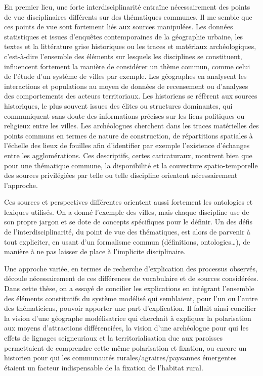 En premier lieu, une forte interdisciplinarité entraîne nécessairement des points de vue disciplinaires différents sur des thématiques communes.
Il me semble que ces points de vue sont fortement liés aux sources manipulées.
Les données statistiques et issues d'enquêtes contemporaines de la géographie urbaine, les textes et la littérature grise historiques ou les traces et matériaux archéologiques, c'est-à-dire l'ensemble des éléments sur lesquels les disciplines se constituent, influencent fortement la manière de considérer un thème commun, comme celui de l'étude d'un système de villes par exemple.
Les géographes en analysent les interactions et populations au moyen de données de recensement ou d'analyses des comportements des acteurs territoriaux.
Les historiens se réfèrent aux sources historiques, le plus souvent issues des élites ou structures dominantes, qui communiquent sans doute des informations précises sur les liens politiques ou religieux entre les villes.
Les archéologues cherchent dans les traces matérielles des points communs en termes de nature de construction, de répartitions spatiales à l'échelle des lieux de fouilles afin d'identifier par exemple l'existence d'échanges entre les agglomérations.
Ces descriptifs, certes caricaturaux, montrent bien que pour une thématique commune, la disponibilité et la couverture spatio-temporelle des sources privilégiées par telle ou telle discipline orientent nécessairement l'approche.

Ces sources et perspectives différentes orientent aussi fortement les ontologies et lexiques utilisés.
On a donné l'exemple des villes, mais chaque discipline use de son propre jargon et se dote de concepts spécifiques pour le définir.
Un des défis de l'interdisciplinarité, du point de vue des thématiques, est alors de parvenir à tout expliciter, en usant d'un formalisme commun (définitions, ontologies\ldots), de manière à ne pas laisser de place à l'implicite disciplinaire.

Une approche variée, en termes de recherche d'explication des processus observés, découle nécessairement de ces différences de vocabulaire et de sources considérées.
Dans cette thèse, on a essayé de concilier les explications en intégrant l'ensemble des éléments constitutifs du système modélisé qui semblaient, pour l'un ou l'autre des thématiciens, pouvoir apporter une part d'explication.
Il fallait ainsi concilier la vision d'une géographe modélisatrice qui cherchait à expliquer la polarisation aux moyens d'attractions différenciées, la vision d'une archéologue pour qui les effets de lignages seigneuriaux et la territorialisation due aux paroisses permettaient de comprendre cette même polarisation et fixation, ou encore un historien pour qui les communautés rurales/agraires/paysannes émergentes étaient un facteur indispensable de la fixation de l'habitat rural.

